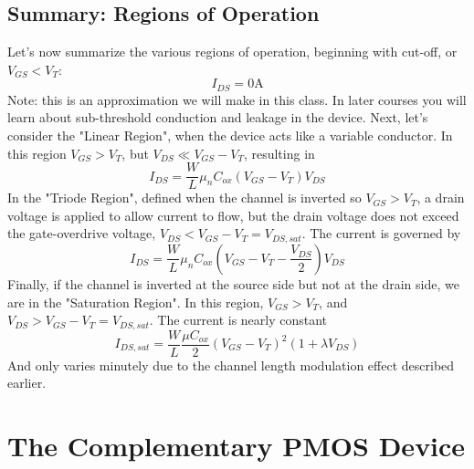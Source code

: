 \subsection{Summary: Regions of Operation}
Let's now summarize the various regions of operation, beginning with cut-off, or $V_{GS} < V_T$:
    \begin{equation}
        I_{DS} = 0\mathrm{A}
    \end{equation}
Note: this is an approximation we will make in this class.  In later courses you will learn about sub-threshold conduction and leakage in the device.  
Next, let's consider the "Linear Region", when the device acts like a variable conductor.  In this region  $V_{GS} > V_T$, but $V_{DS} \ll V_{GS} - V_T$, resulting in
    \begin{equation}
        {I_{DS}} = \frac{W}{L}{\mu _n}{C_{ox}}({V_{GS}} - {V_T}){V_{DS}}
    \end{equation}
In the "Triode Region", defined when the channel is inverted so $V_{GS} > V_T$, a drain voltage is applied to allow current to flow, but the drain voltage does not exceed the gate-overdrive voltage, $V_{DS} < V_{GS} - V_T = V_{DS,sat}$.  The current is governed by
    \begin{equation}
        {I_{DS}} = \frac{W}{L}{\mu _n}{C_{ox}}({V_{GS}} - {V_T} - \frac{{{V_{DS}}}}{2}){V_{DS}}
    \end{equation}
Finally, if the channel is inverted at the source side but not at the drain side, we are in the "Saturation Region".  In this region, $V_{GS} > V_T$, and $V_{DS} > V_{GS} - V_T = V_{DS,sat}$.  The current is nearly constant
    \begin{equation}
        {I_{DS,sat}} = \frac{W}{L}\frac{{\mu {C_{ox}}}}{2}{({V_{GS}} - {V_T})^2}(1 + \lambda {V_{DS}})
    \end{equation}
And only varies minutely due to the channel length modulation effect described earlier. 
\section{The Complementary PMOS Device}
